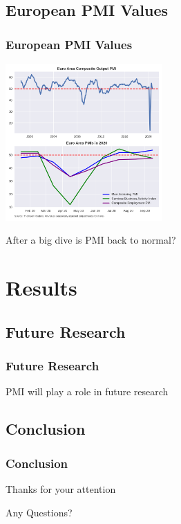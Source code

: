 \documentclass[10pt]{beamer}
\begin{document}
\begin{frame}
\subsection{European PMI Values}
\frametitle{European PMI Values}

\begin{center}
\includegraphics[height=6cm]{PMIs.png}
\end{center}

After a big dive is PMI back to normal?

\end{frame}
\section{Results}
\begin{frame}
\subsection{Future Research}
\frametitle{Future Research}

PMI will play a role in future research

\end{frame}
\begin{frame}
\subsection{Conclusion}
\frametitle{Conclusion}

Thanks for your attention

\vspace{1cm}

Any Questions?

\end{frame}
\end{document}
